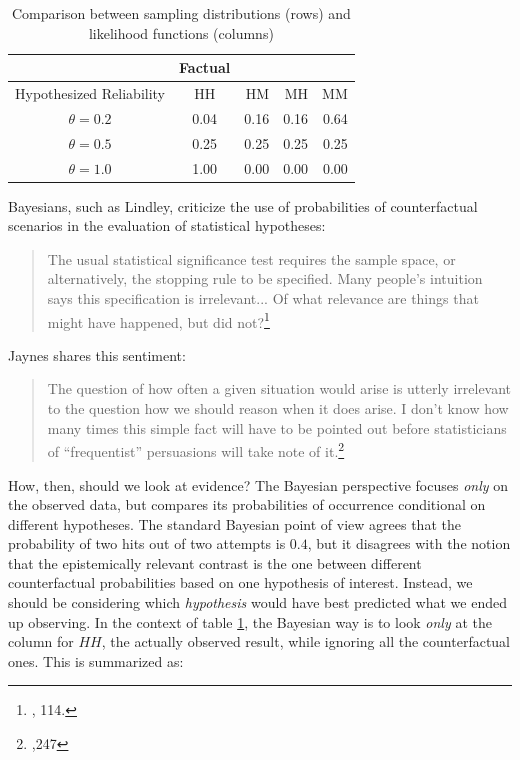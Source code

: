 \begin{table}[]
\centering
\begin{tabular}{@{}c||c|rrr@{}}
\toprule
 & Factual & \multicolumn{3}{l}{} Counterfactual\\ \midrule
Hypothesized Reliability & HH & HM      & MH      &  MM    \\\midrule
$\theta=0.2$ & 0.04 &   0.16    &   0.16    &    0.64  \\
 $\theta=0.5$& 0.25 &    0.25   &   0.25    &    0.25  \\
 $\theta=1.0$& 1.00 &   0.00    &   0.00    &   0.00   \\ \bottomrule
\end{tabular}
  \label{tab:likelihoodvscf}
  \caption{Comparison between sampling distributions (rows) and likelihood functions (columns)}
\end{table}

Bayesians, such as Lindley, criticize the use of probabilities of counterfactual scenarios in the evaluation of statistical hypotheses:


\begin{quote}
The usual statistical significance test requires the sample space, or alternatively, the stopping rule to be specified. Many people's intuition says this specification is irrelevant... Of what relevance are things that might have happened, but did not?\footnote{\cite{lindleybern}, 114.}
\end{quote}

Jaynes shares this sentiment:

\begin{quote}
The question of how often a given situation would arise is utterly
irrelevant to the question how we should reason when it does arise. I
don't know how many times this simple fact will have to be pointed out
before statisticians of ``frequentist'' persuasions will take note of
it.\footnote{\cite{jaynesmight},247}
\end{quote}

How, then, should we look at evidence? The Bayesian perspective focuses \emph{only} on the observed data, but compares its probabilities of occurrence conditional on different hypotheses. The standard Bayesian point of view agrees that the probability of two hits out of two attempts is $0.4$, but it disagrees with the notion that the epistemically relevant contrast is the one between different counterfactual probabilities based on one hypothesis of interest. Instead, we should be considering which \emph{hypothesis} would have best predicted what we ended up observing. In the context of table \ref{tab:likelihoodvscf}, the Bayesian way is to look \emph{only} at the column for $HH$, the actually observed result, while ignoring all the counterfactual ones. This is summarized as: 

